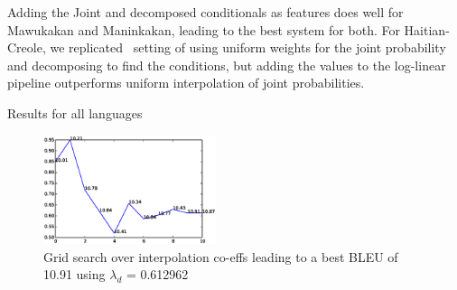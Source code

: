 Adding the Joint and decomposed conditionals as features does well for Mawukakan and Maninkakan, leading to the best system for both. For Haitian-Creole, we replicated~\cite{Cohn:07} setting of using uniform weights for the joint probability and decomposing to find the conditions, but adding the values to the log-linear pipeline outperforms uniform interpolation of joint probabilities.


\begin{table}
	\small
	\centering
	
	\caption{Results for all languages}
	\label{table:all_results}
\end{table}



     \begin{figure}
                \small
                \centering
                \includegraphics[width=0.45\textwidth]{files/Figures/condor_run.eps}
                \caption{Grid search over interpolation co-effs leading to a best BLEU of 10.91 using $\lambda_{d}$ = 0.612962}
                \label{fig:condor}
     \end{figure}
